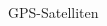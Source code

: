 \begin{frame}{GPS-Satelliten}
\begin{columns}
\begin{column}{0.5\textwidth}
\begin{figure}
            \end{figure}
        \end{column}
    \end{columns}
\end{frame}
